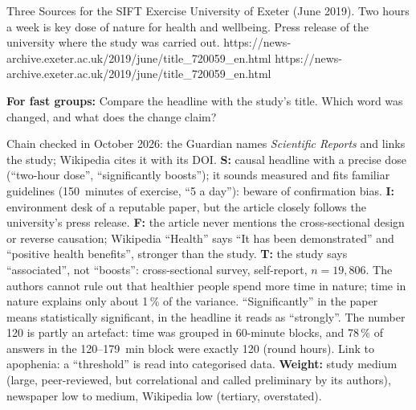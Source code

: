 \begin{uebungsblattc}{Three Sources for the SIFT Exercise}
{University of Exeter (June 2019). Two hours a week is key dose of nature
for health and wellbeing. Press release of the university where the study
was carried out.}
{https://news-archive.exeter.ac.uk/2019/june/title_720059_en.html}
{https://news-archive.exeter.ac.uk/2019/june/title_720059_en.html}

\textbf{For fast groups:} Compare the headline with the study's title.
Which word was changed, and what does the change claim?

\LEvierVolltexte

\begin{lehrhinweis}
Chain checked in October 2026: the Guardian names \emph{Scientific
Reports} and links the study; Wikipedia cites it with its DOI.
\textbf{S:} causal headline with a precise dose (\enquote{two-hour dose},
\enquote{significantly boosts}); it sounds measured and fits familiar
guidelines (150~minutes of exercise, \enquote{5 a day}): beware of
confirmation bias. \textbf{I:} environment desk of a reputable paper, but
the article closely follows the university's press release.
\textbf{F:} the article never mentions the cross-sectional design or
reverse causation; Wikipedia \enquote{Health} says \enquote{It has been
demonstrated} and \enquote{positive health benefits}, stronger than the
study. \textbf{T:} the study says \enquote{associated}, not
\enquote{boosts}: cross-sectional survey, self-report, $n = 19{,}806$.
The authors cannot rule out that healthier people spend more time in
nature; time in nature explains only about 1\,\% of the variance.
\enquote{Significantly} in the paper means statistically significant, in
the headline it reads as \enquote{strongly}. The number 120 is partly an
artefact: time was grouped in 60-minute blocks, and 78\,\% of answers in
the 120--179~min block were exactly 120 (round hours). Link to apophenia:
a \enquote{threshold} is read into categorised data. \textbf{Weight:}
study medium (large, peer-reviewed, but correlational and called
preliminary by its authors), newspaper low to medium, Wikipedia low
(tertiary, overstated).
\end{lehrhinweis}
\end{uebungsblattc}
